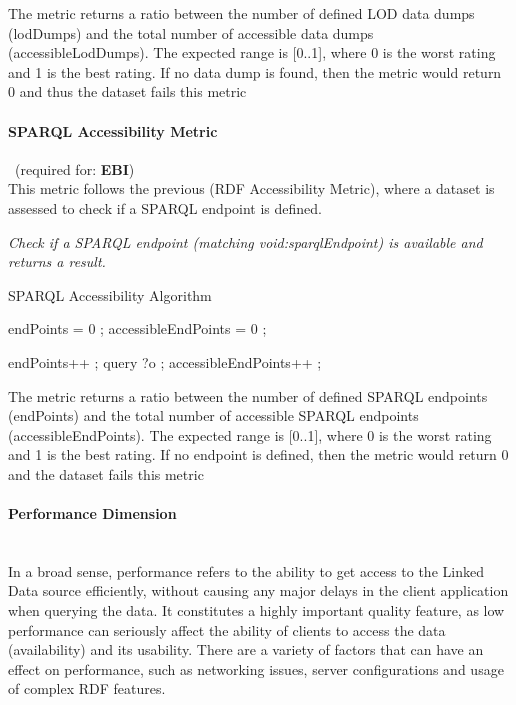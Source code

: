 The metric returns a ratio between the number of defined LOD data dumps (lodDumps) and the total number of accessible data dumps (accessibleLodDumps). 
The expected range is [0..1], where 0 is the worst rating and 1 is the best rating. If no data dump is found, then the metric would return 0 and thus the dataset fails this metric

\paragraph{SPARQL Accessibility Metric}~(required for: \textbf{EBI})~\\
This metric follows the previous (RDF Accessibility Metric), where a dataset is assessed to check if a SPARQL endpoint is defined.

\begin{mdframed}[style=metricdefinition]
\emph{Check if a SPARQL endpoint (matching void:sparqlEndpoint) is available and returns a result.}
\end{mdframed}

\begin{algorithm}
\caption{SPARQL Accessibility Algorithm}\label{lst:deref}
\begin{algorithmic}[1]
\State endPoints = 0 ;
\State accessibleEndPoints = 0 ;
\EndProcedure

\State endPoints++ ; 
\State query ?o ;
 accessibleEndPoints++ ; \EndIf
\EndIf
\EndProcedure
\end{algorithmic}
\end{algorithm}

The metric returns a ratio between the number of defined SPARQL endpoints (endPoints) and the total number of accessible SPARQL endpoints (accessibleEndPoints). 
The expected range is [0..1], where 0 is the worst rating and 1 is the best rating. If no endpoint is defined, then the metric would return 0 and the dataset fails this metric

\paragraph{Performance Dimension}~\\ %
In a broad sense, performance refers to the ability to get access to the Linked Data source efficiently, without causing any major delays in the client application when querying the data. It constitutes a highly important quality feature, as low performance can seriously affect the ability of clients to access the data (availability) and its usability. There are a variety of factors that can have an effect on performance, such as networking issues, server configurations and usage of complex RDF features.


